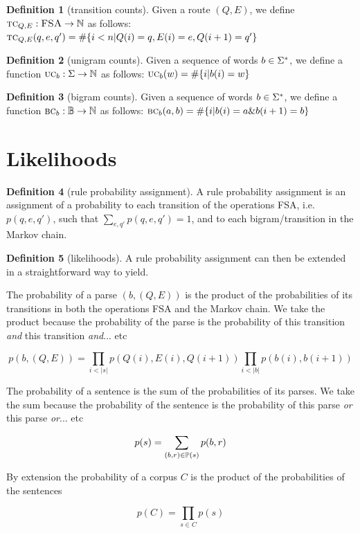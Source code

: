 \documentclass[12pt]{article}
\theoremstyle{definition}
\newtheorem{definition}{Definition}[section]
\begin{document}
\begin{definition}[transition counts]
  Given a route $(Q,E)$, we define $\text{\textsc{tc}}_{Q,E} : \textsc{FSA} \rightarrow\mathbb{N}$ as follows: $\text{\textsc{tc}}_{Q,E}(q,e,q') = \#\{ i<n | Q(i)=q,E(i)=e,Q({i+1})=q'\}$
\end{definition}

\begin{definition}[unigram counts]
  Given a sequence of words $b\in\Sigma^*$, we define a function $\text{\textsc{uc}}_b : \Sigma \rightarrow\mathbb{N}$ as follows: $\text{\textsc{uc}}_b(w) = \#\{ i | b(i) = w \}$
\end{definition}


\begin{definition}[bigram counts]
  Given a sequence of words $b\in\Sigma^*$, we define a function $\text{\textsc{bc}}_{b} : \mathbb{B} \rightarrow\mathbb{N}$ as follows: $\text{\textsc{bc}}_b(a,b) = \#\{ i | b(i)=a \& b(i+1) = b \}$
\end{definition}


\section{Likelihoods}

\begin{definition}[rule probability assignment]
A rule probability assignment is an assignment of a probability to each transition of the operations FSA, i.e. $p(q,e,q')$, such that $\sum_{e,q'}p(q,e,q')=1$, and to each bigram/transition in the Markov chain.
\end{definition}


\begin{definition}[likelihoods]
A rule probability assignment can then be extended in a straightforward way to yield. 

The probability of a parse $(b,(Q,E))$ is the product of the probabilities of its transitions in both the operations FSA and the Markov chain. We take the product because the probability of the parse is the probability of this transition \textit{and} this transition \textit{and}... etc

$$p(b,(Q,E)) = \prod_{i<|s|} p(Q(i),E(i),Q(i+1)) \prod_{i<|b|} p(b(i),b(i+1))$$


The probability of a sentence is the sum of the probabilities of its parses. We take the sum because the probability of the sentence is the probability of this parse \textit{or} this parse \textit{or}... etc

$$p(s) = \sum_{(b,r)\in\mathbb{P}(s)} p(b,r)$$

 By extension the probability of a corpus $C$ is the product of the probabilities of the sentences

$$p(C)=\prod_{s\in C}p(s)$$
\end{definition}
\end{document}
